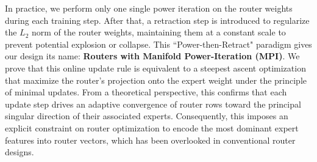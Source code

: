 \documentclass[11pt]{article}
\newcommand{\name}{MPI}
\begin{document}
In practice, we perform only one single power iteration on the router weights during each training step.
After that, a retraction step is introduced to regularize the $L_2$ norm of the router weights, maintaining them at a constant scale to prevent potential explosion or collapse. 
This ``Power-then-Retract" paradigm gives our design its name: \textbf{Routers with Manifold Power-Iteration (\name)}.
We prove that this online update rule is equivalent to a steepest ascent optimization that maximize the router's projection onto the expert weight under the principle of minimal updates.
From a theoretical perspective, this confirms that each update step drives an adaptive convergence of router rows toward the principal singular direction of their associated experts.
Consequently, this imposes an explicit constraint on router optimization to encode the most dominant expert features into router vectors, which has been overlooked in conventional router designs.


\end{document}
